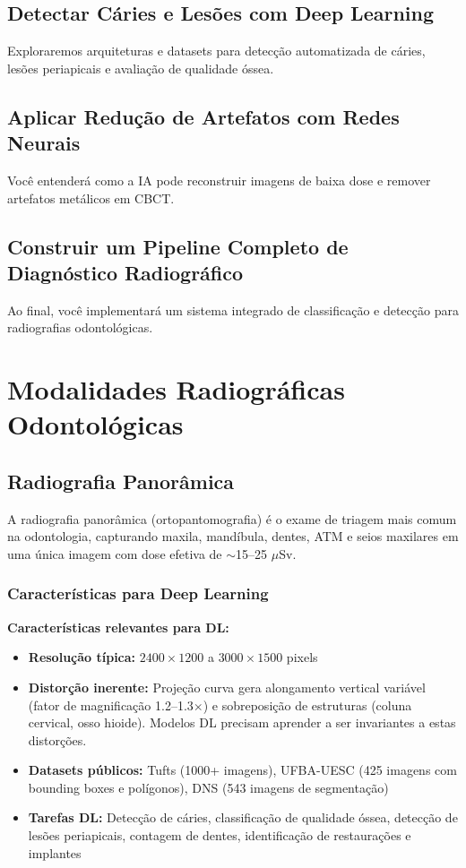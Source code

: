 \subsection{Detectar Cáries e Lesões com Deep Learning}
Exploraremos arquiteturas e datasets para detecção automatizada de cáries, lesões periapicais e avaliação de qualidade óssea.

\subsection{Aplicar Redução de Artefatos com Redes Neurais}
Você entenderá como a IA pode reconstruir imagens de baixa dose e remover artefatos metálicos em CBCT.

\subsection{Construir um Pipeline Completo de Diagnóstico Radiográfico}
Ao final, você implementará um sistema integrado de classificação e detecção para radiografias odontológicas.

\section{Modalidades Radiográficas Odontológicas}
\label{sec:modalidades}

\subsection{Radiografia Panorâmica}

A radiografia panorâmica (ortopantomografia) é o exame de triagem mais comum
na odontologia, capturando maxila, mandíbula, dentes, ATM e seios maxilares
em uma única imagem com dose efetiva de $\sim$15--25 $\mu$Sv.

\subsubsection{Características para Deep Learning}

\textbf{Características relevantes para DL:}
\begin{itemize}
  \item \textbf{Resolução típica:} $2400 \times 1200$ a $3000 \times 1500$ pixels
  \item \textbf{Distorção inerente:} Projeção curva gera alongamento vertical
        variável (fator de magnificação 1.2--1.3$\times$) e sobreposição de
        estruturas (coluna cervical, osso hioide). Modelos DL precisam aprender
        a ser invariantes a estas distorções.
  \item \textbf{Datasets públicos:} Tufts (1000+ imagens), UFBA-UESC (425 imagens
        com bounding boxes e polígonos), DNS (543 imagens de segmentação)
  \item \textbf{Tarefas DL:} Detecção de cáries, classificação de qualidade óssea,
        detecção de lesões periapicais, contagem de dentes, identificação de
        restaurações e implantes
\end{itemize}

